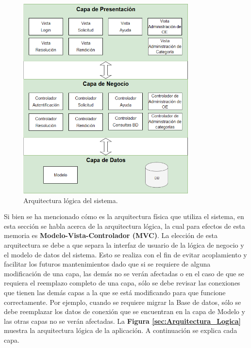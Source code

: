 \begin{figure}[htb]
    \hspace{12mm}
    \includegraphics[width=0.8\textwidth]{Imagenes/Arquitectura_logica.png}
    \caption{\label{fig: Arquitectura_Logica}Arquitectura lógica del sistema.}
\end{figure}

Si bien se ha mencionado cómo es la arquitectura física que utiliza el sistema, en esta sección se habla acerca de la arquitectura lógica, la cual para efectos de esta memoria es \textbf{Modelo-Vista-Controlador (MVC)}. La elección de esta arquitectura se debe a que separa la interfaz de usuario de la lógica de negocio y el modelo de datos del sistema. Esto se realiza con el fin de evitar acoplamiento y facilitar los futuros mantenimientos dado que si se requiere de alguna modificación de una capa, las demás no se verán afectadas o en el caso de que se requiera el reemplazo completo de una capa, sólo se debe revisar las conexiones que tienen las demás capas a la que se está modificando para que funcione correctamente. Por ejemplo, cuando se requiere migrar la Base de datos, sólo se debe reemplazar los datos de conexión que se encuentran en la capa de Modelo y las otras capas no se verán afectadas. La \textbf{Figura \ref{sec:Arquitectura_Logica}} muestra la arquitectura lógica de la aplicación. A continuación se explica cada capa.

